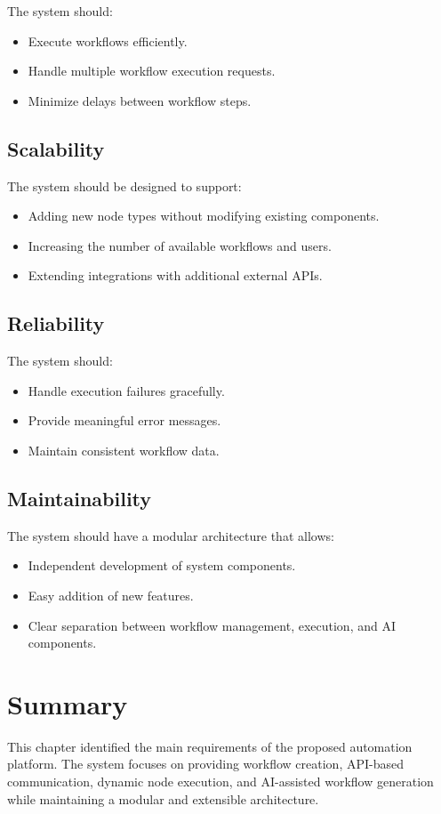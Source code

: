 The system should:

\begin{itemize}
    \item Execute workflows efficiently.
    \item Handle multiple workflow execution requests.
    \item Minimize delays between workflow steps.
\end{itemize}

\subsection{Scalability}

The system should be designed to support:

\begin{itemize}
    \item Adding new node types without modifying existing components.
    \item Increasing the number of available workflows and users.
    \item Extending integrations with additional external APIs.
\end{itemize}

\subsection{Reliability}

The system should:

\begin{itemize}
    \item Handle execution failures gracefully.
    \item Provide meaningful error messages.
    \item Maintain consistent workflow data.
\end{itemize}

\subsection{Maintainability}

The system should have a modular architecture that allows:

\begin{itemize}
    \item Independent development of system components.
    \item Easy addition of new features.
    \item Clear separation between workflow management, execution, and AI components.
\end{itemize}

\section{Summary}

This chapter identified the main requirements of the proposed automation platform. The system focuses on providing workflow creation, API-based communication, dynamic node execution, and AI-assisted workflow generation while maintaining a modular and extensible architecture.